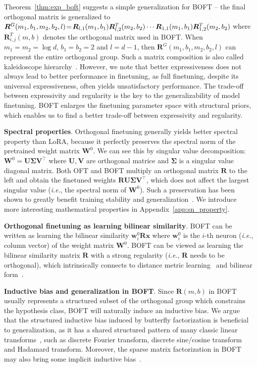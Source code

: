 \documentclass{article} %
\newcommand{\ie}{\emph{i.e.}}
\begin{document}
Theorem~\ref{thm:exp_boft} suggests a simple generalization for BOFT -- the final orthogonal matrix is generalized to $\thickmuskip=2mu \medmuskip=2mu \bm{R}^G(m_1,b_1,m_2,b_2,l)=\bm{R}_{l,1}(m_1,b_1)\bm{R}_{l,2}^T(m_2,b_2)\cdots\bm{R}_{1,1}(m_1,b_1)\bm{R}_{1,2}^T(m_2,b_2)$ where $\bm{R}_{i,j}^T(m,b)$ denotes the orthogonal matrix used in BOFT. When $m_1=m_2=\log d$, $b_1=b_2=2$ and $l=d-1$, then $\bm{R}^G(m_1,b_1,m_2,b_2,l)$ can represent the entire orthogonal group. Such a matrix composition is also called kaleidoscope hierarchy~\cite{dao2019kaleidoscope}. However, we note that better expressiveness does not always lead to better performance in finetuning, as full finetuning, despite its universal expressiveness, often yields unsatisfactory performance. The trade-off between expressivity and regularity is the key to the generalizability of model finetuning. BOFT enlarges the finetuning parameter space with structural priors, which enables us to find a better trade-off between expressivity and regularity.

\textbf{Spectral properties}. Orthogonal finetuning generally yields better spectral property than LoRA, because it perfectly preserves the spectral norm of the pretrained weight matrix $\bm{W}^0$. We can see this by singular value decomposition: $\bm{W}^0=\bm{U}\bm{\Sigma}\bm{V}^\top$ where $\bm{U},\bm{V}$ are orthogonal matrice and $\bm{\Sigma}$ is a singular value diagonal matrix. Both OFT and BOFT multiply an orthogonal matrix $\bm{R}$ to the left and obtain the finetuned weights $\bm{R}\bm{U}\bm{\Sigma}\bm{V}^\top$, which does not affect the largest singular value (\ie, the spectral norm of $\bm{W}^0$). Such a preservation has been shown to greatly benefit training stability and generalization~\cite{miyato2018spectral,yoshida2017spectral}. We introduce more interesting mathematical properties in Appendix~\ref{app:sn_property}.

\textbf{Orthogonal finetuning as learning bilinear similarity}. BOFT can be written as learning the bilinear similarity $\bm{w}^0_i\bm{R}\bm{x}$ where $\bm{w}^0_i$ is the $i$-th neuron (\ie, column vector) of the weight matrix $\bm{W}^0$. BOFT can be viewed as learning the bilinear similarity matrix $\bm{R}$ with a strong regularity (\ie, $\bm{R}$ needs to be orthogonal), which intrinsically connects to distance metric learning~\cite{xing2002distance} and bilinear form~\cite{roman2005advanced}.

\textbf{Inductive bias and generalization in BOFT}. Since $\bm{R}(m,b)$ in BOFT usually represents a structured subset of the orthogonal group which constrains the hypothesis class, BOFT will naturally induce an inductive bias. We argue that the structured inductive bias induced by butterfly factorization is beneficial to generalization, as it has a shared structured pattern of many classic linear transforms~\cite{dao2019kaleidoscope}, such as discrete Fourier transform, discrete sine/cosine transform and Hadamard transform. Moreover, the sparse matrix factorization in BOFT may also bring some implicit inductive bias~\cite{gunasekar2017implicit,li2018algorithmic,liu2019neural}.
\end{document}
